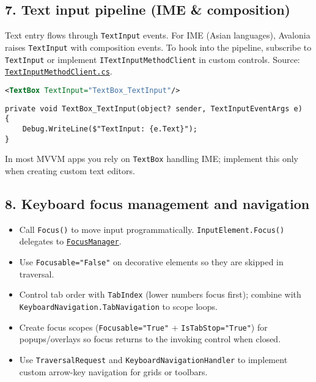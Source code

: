 \subsection{7. Text input pipeline (IME \&
composition)}\label{text-input-pipeline-ime-composition}

Text entry flows through \passthrough{\lstinline!TextInput!} events. For
IME (Asian languages), Avalonia raises
\passthrough{\lstinline!TextInput!} with composition events. To hook
into the pipeline, subscribe to \passthrough{\lstinline!TextInput!} or
implement \passthrough{\lstinline!ITextInputMethodClient!} in custom
controls. Source:
\href{https://github.com/AvaloniaUI/Avalonia/blob/master/src/Avalonia.Base/Input/TextInput/TextInputMethodClient.cs}{\passthrough{\lstinline!TextInputMethodClient.cs!}}.

\begin{lstlisting}[language=XML]
<TextBox TextInput="TextBox_TextInput"/>
\end{lstlisting}

\begin{lstlisting}
private void TextBox_TextInput(object? sender, TextInputEventArgs e)
{
    Debug.WriteLine($"TextInput: {e.Text}");
}
\end{lstlisting}

In most MVVM apps you rely on \passthrough{\lstinline!TextBox!} handling
IME; implement this only when creating custom text editors.

\subsection{8. Keyboard focus management and
navigation}\label{keyboard-focus-management-and-navigation}

\begin{itemize}
\tightlist
\item
  Call \passthrough{\lstinline!Focus()!} to move input programmatically.
  \passthrough{\lstinline!InputElement.Focus()!} delegates to
  \href{https://github.com/AvaloniaUI/Avalonia/blob/master/src/Avalonia.Base/Input/FocusManager.cs}{\passthrough{\lstinline!FocusManager!}}.
\item
  Use \passthrough{\lstinline!Focusable="False"!} on decorative elements
  so they are skipped in traversal.
\item
  Control tab order with \passthrough{\lstinline!TabIndex!} (lower
  numbers focus first); combine with
  \passthrough{\lstinline!KeyboardNavigation.TabNavigation!} to scope
  loops.
\item
  Create focus scopes (\passthrough{\lstinline!Focusable="True"!} +
  \passthrough{\lstinline!IsTabStop="True"!}) for popups/overlays so
  focus returns to the invoking control when closed.
\item
  Use \passthrough{\lstinline!TraversalRequest!} and
  \passthrough{\lstinline!KeyboardNavigationHandler!} to implement
  custom arrow-key navigation for grids or toolbars.
\end{itemize}

